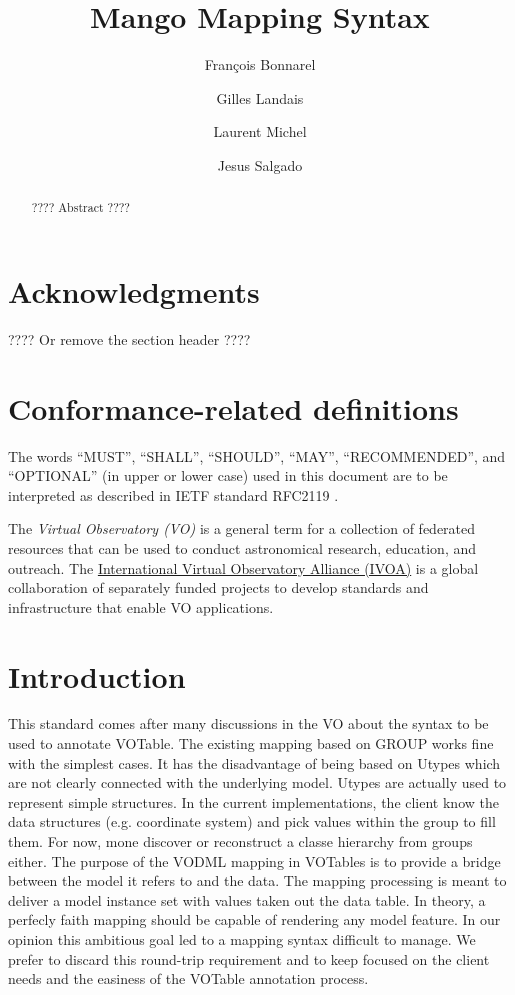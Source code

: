 \documentclass[11pt,a4paper]{ivoa}
\title{Mango Mapping Syntax}
\author{François Bonnarel}
\author{Gilles Landais}
\author{Laurent Michel}
\author{Jesus Salgado}
\begin{document}
\begin{abstract}
???? Abstract ????
\end{abstract}


\section*{Acknowledgments}

???? Or remove the section header ????

\section*{Conformance-related definitions}

The words ``MUST'', ``SHALL'', ``SHOULD'', ``MAY'', ``RECOMMENDED'', and
``OPTIONAL'' (in upper or lower case) used in this document are to be
interpreted as described in IETF standard RFC2119 \citep{std:RFC2119}.

The \emph{Virtual Observatory (VO)} is a
general term for a collection of federated resources that can be used
to conduct astronomical research, education, and outreach.
The \href{http://www.ivoa.net}{International
Virtual Observatory Alliance (IVOA)} is a global
collaboration of separately funded projects to develop standards and
infrastructure that enable VO applications.


\section{Introduction}
This standard comes after many discussions in the VO about the syntax to be used to annotate VOTable. 
The existing mapping based on GROUP works fine with the simplest cases. It has the disadvantage of being based on Utypes which are not clearly connected with the underlying model. Utypes are actually used to represent simple structures. In the current implementations, the client know the data structures (e.g. coordinate system) and pick values within the group to fill them. For now, mone discover or reconstruct a classe hierarchy from groups either. 
The purpose of the VODML mapping in VOTables is to provide a bridge between the model it refers to and the data. The mapping processing is meant to deliver a model instance set with values taken out the data table. In theory, a perfecly faith mapping should be capable of rendering any model feature. In our opinion this ambitious goal led to a mapping syntax difficult to manage.
We prefer to discard this round-trip requirement and to keep focused on the client needs and the easiness of the VOTable annotation process.
\end{document}
